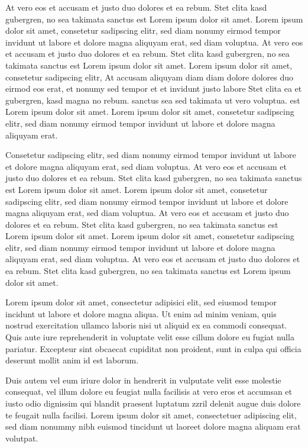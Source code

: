 \documentclass[twoside,a4paper]{article}
\begin{document}
At vero eos et accusam et justo duo dolores et ea rebum. Stet clita kasd gubergren, no sea takimata sanctus est Lorem ipsum dolor sit amet. Lorem ipsum dolor sit amet, consetetur sadipscing elitr, sed diam nonumy eirmod tempor invidunt ut labore et dolore magna aliquyam erat, sed diam voluptua. At vero eos et accusam et justo duo dolores et ea rebum. Stet clita kasd gubergren, no sea takimata sanctus est Lorem ipsum dolor sit amet. Lorem ipsum dolor sit amet, consetetur sadipscing elitr, At accusam aliquyam diam diam dolore dolores duo eirmod eos erat, et nonumy sed tempor et et invidunt justo labore Stet clita ea et gubergren, kasd magna no rebum. sanctus sea sed takimata ut vero voluptua. est Lorem ipsum dolor sit amet. Lorem ipsum dolor sit amet, consetetur sadipscing elitr, sed diam nonumy eirmod tempor invidunt ut labore et dolore magna aliquyam erat.

Consetetur sadipscing elitr, sed diam nonumy eirmod tempor invidunt ut labore et dolore magna aliquyam erat, sed diam voluptua. At vero eos et accusam et justo duo dolores et ea rebum. Stet clita kasd gubergren, no sea takimata sanctus est Lorem ipsum dolor sit amet. Lorem ipsum dolor sit amet, consetetur sadipscing elitr, sed diam nonumy eirmod tempor invidunt ut labore et dolore magna aliquyam erat, sed diam voluptua. At vero eos et accusam et justo duo dolores et ea rebum. Stet clita kasd gubergren, no sea takimata sanctus est Lorem ipsum dolor sit amet. Lorem ipsum dolor sit amet, consetetur sadipscing elitr, sed diam nonumy eirmod tempor invidunt ut labore et dolore magna aliquyam erat, sed diam voluptua. At vero eos et accusam et justo duo dolores et ea rebum. Stet clita kasd gubergren, no sea takimata sanctus est Lorem ipsum dolor sit amet.

Lorem ipsum dolor sit amet, consectetur adipisici elit, sed eiusmod tempor incidunt ut labore et dolore magna aliqua. Ut enim ad minim veniam, quis nostrud exercitation ullamco laboris nisi ut aliquid ex ea commodi consequat. Quis aute iure reprehenderit in voluptate velit esse cillum dolore eu fugiat nulla pariatur. Excepteur sint obcaecat cupiditat non proident, sunt in culpa qui officia deserunt mollit anim id est laborum.


Duis autem vel eum iriure dolor in hendrerit in vulputate velit esse molestie consequat, vel illum dolore eu feugiat nulla facilisis at vero eros et accumsan et iusto odio dignissim qui blandit praesent luptatum zzril delenit augue duis dolore te feugait nulla facilisi. Lorem ipsum dolor sit amet, consectetuer adipiscing elit, sed diam nonummy nibh euismod tincidunt ut laoreet dolore magna aliquam erat volutpat.
\end{document}
